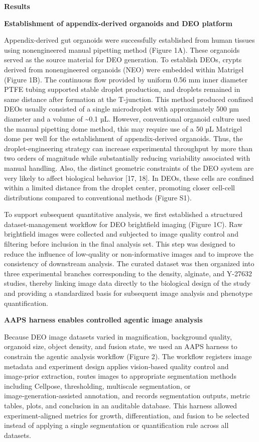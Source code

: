 \documentclass[
]{article}
\begin{document}
\textbf{Results}

\textbf{Establishment of appendix-derived organoids and DEO platform}

Appendix-derived gut organoids were successfully established from human tissues using nonengineered manual pipetting method (Figure 1A). These organoids served as the source material for DEO generation. To establish DEOs, crypts derived from nonengineered organoids (NEO) were embedded within Matrigel (Figure 1B). The continuous flow provided by uniform 0.56 mm inner diameter PTFE tubing supported stable droplet production, and droplets remained in same distance after formation at the T-junction. This method produced confined DEOs usually consisted of a single microdroplet with approximately 500 µm diameter and a volume of \textasciitilde0.1 µL. However, conventional organoid culture used the manual pipetting dome method, this may require use of a 50 µL Matrigel dome per well for the establishment of appendix-derived organoids. Thus, the droplet-engineering strategy can increase experimental throughput by more than two orders of magnitude while substantially reducing variability associated with manual handling. Also, the distinct geometric constraints of the DEO system are very likely to affect biological behavior {[}17, 18{]}. In DEOs, these cells are confined within a limited distance from the droplet center, promoting closer cell-cell distributions compared to conventional methods (Figure S1).

To support subsequent quantitative analysis, we first established a structured dataset-management workflow for DEO brightfield imaging (Figure 1C). Raw brightfield images were collected and subjected to image quality control and filtering before inclusion in the final analysis set. This step was designed to reduce the influence of low-quality or non-informative images and to improve the consistency of downstream analysis. The curated dataset was then organized into three experimental branches corresponding to the density, alginate, and Y-27632 studies, thereby linking image data directly to the biological design of the study and providing a standardized basis for subsequent image analysis and phenotype quantification.

\textbf{AAPS harness enables controlled agentic image analysis}

Because DEO image datasets varied in magnification, background quality, organoid size, object density, and fusion state, we used an AAPS harness to constrain the agentic analysis workflow (Figure 2). The workflow registers image metadata and experiment design applies vision‑based quality control and image‑prior extraction, routes images to appropriate segmentation methods including Cellpose, thresholding, multiscale segmentation, or image‑generation‑assisted annotation, and records segmentation outputs, metric tables, plots, and conclusion in an auditable database. This harness allowed experiment‑aligned metrics for growth, differentiation, and fusion to be selected instead of applying a single segmentation or quantification rule across all datasets.
\end{document}
